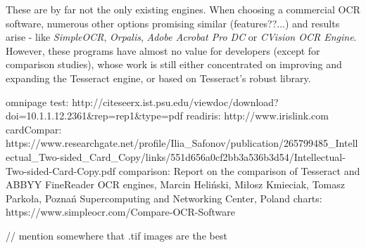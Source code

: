 These are by far not the only existing engines. When choosing a commercial OCR software, numerous other options promising similar (features??...) and results arise - like \emph{SimpleOCR}, \emph{Orpalis}, \emph{Adobe Acrobat Pro DC} or \emph{CVision OCR Engine}. However, these programs have almost no value for developers (except for comparison studies), whose work is still either concentrated on improving and expanding the Tesseract engine, or based on Tesseract's robust library.


omnipage test: http://citeseerx.ist.psu.edu/viewdoc/download?doi=10.1.1.12.2361&rep=rep1&type=pdf
readiris: http://www.irislink.com
cardCompar: https://www.researchgate.net/profile/Ilia_Safonov/publication/265799485_Intellectual_Two-sided_Card_Copy/links/551d656a0cf2bb3a536b3d54/Intellectual-Two-sided-Card-Copy.pdf
comparison: Report on the comparison of Tesseract and ABBYY FineReader OCR engines, Marcin Heliński, Miłosz Kmieciak, Tomasz Parkoła, Poznań Supercomputing and Networking Center, Poland
charts: https://www.simpleocr.com/Compare-OCR-Software

// mention somewhere that .tif images are the best
